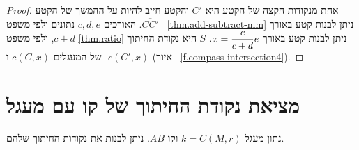 \begin{proof}
%




אחת מנקודות הקצה של הקטע היא
$C'$
והקטע חייב להיות על ההמשך של הקטע
$\overline{CC'}$.
האורכים
$c,d,e$
נתונים ולפי משפט
~\ref{thm.add-subtract-mm}
ניתן לבנות קטע באורך
$c+d$,
ולפי משפט
\ref{thm.ratio}
ניתן לבנות קטע באורך
$x=\displaystyle\frac{c}{c+d}e$.
$S$
היא נקודת החיתוך של המעגלים
$c(C,x)$
ו-%
$c(C',x)$
(איור%
~\ref{f.compass-intersection4}).
\end{proof}

\section{מציאת נקודת החיתוך של קו עם מעגל}\label{s.line-circle}

\begin{theorem}
נתון מעגל
$k=C(M,r)$
וקו
$\overline{AB}$.
ניתן לבנות את נקודות החיתוך שלהם.
\end{theorem}



